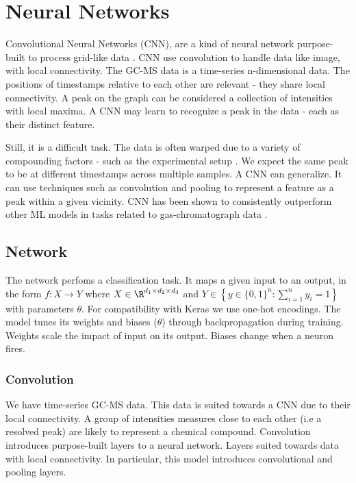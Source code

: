 
\chapter{Neural Networks}
\label{ch:neural}

Convolutional Neural Networks (CNN), are a kind of neural network purpose-built to process grid-like data \cite{lecun1989generalization}. CNN use convolution to handle data like image, with local connectivity. The GC-MS data is a time-series n-dimensional data. The positions of timestamps relative to each other are relevant - they share local connectivity. A peak on the graph can be considered a collection of intensities with local maxima. A CNN may learn to recognize a peak in the data - each as their distinct feature.

Still, it is a difficult task. The data is often warped due to a variety of compounding factors - such as the experimental setup \cite{tomasi2004correlation,zhang2008two}. We expect the same peak to be at different timestamps across multiple samples. A CNN can generalize. It can use techniques such as convolution \cite{lecun1989generalization} and pooling \cite{zhou1988image} to represent a feature as a peak within a given vicinity. CNN has been shown to consistently outperform other ML models in tasks related to gas-chromatograph data \cite{bi2020gc, matyushin2020gas}.

\section{Network}
\label{sec:network}

The network perfoms a classification task. It maps a given input to an output, in the form $f: X \to Y$ where $X \in \R^{d_1 \times d_2 \times d_3}$ and $Y \in \left\{ y \in \{0,1\}^n : \sum^n_{i=1} y_i = 1 \right\}$ with parameters $\theta$. For compatibility with Keras \cite{chollet2015keras} we use one-hot encodings. The model tunes its weights and biases ($\theta$) through backpropagation during training. Weights scale the impact of input on its output. Biases change when a neuron fires.

\subsection{Convolution}
\label{sec:convolution}

We have time-series GC-MS data. This data is suited towards a CNN due to their local connectivity. A group of intensities measures close to each other (i.e a resolved peak) are likely to represent a chemical compound. Convolution introduces purpose-built layers to a neural network. Layers suited towards data with local connectivity. In particular, this model introduces convolutional and pooling layers.

